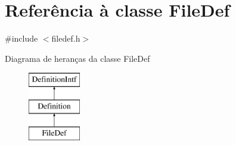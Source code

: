 \hypertarget{class_file_def}{\section{Referência à classe File\-Def}
\label{class_file_def}
}


{\ttfamily \#include $<$filedef.\-h$>$}

Diagrama de heranças da classe File\-Def\begin{figure}[H]
\begin{center}
\leavevmode
\includegraphics[height=3.000000cm]{class_file_def}
\end{center}
\end{figure}
